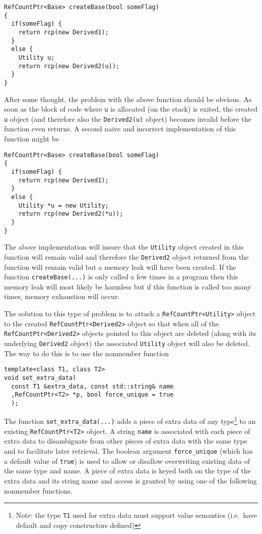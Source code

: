 {\scriptsize\begin{verbatim}
RefCountPtr<Base> createBase(bool someFlag)
{
  if(someFlag) {
    return rcp(new Derived1);
  }
  else {
    Utility u;
    return rcp(new Derived2(u));
  }
}
\end{verbatim}

}{}\noindent{}After some thought, the problem with the above function
should be obvious.  As soon as the block of code where {}\texttt{u} is
allocated (on the stack) is exited, the created {}\texttt{u} object
(and therefore also the {}\texttt{Derived2(u)} object) becomes invalid
before the function even returns.  A second naive and incorrect
implementation of this function might be

{\scriptsize\begin{verbatim}
RefCountPtr<Base> createBase(bool someFlag)
{
  if(someFlag) {
    return rcp(new Derived1);
  }
  else {
    Utility *u = new Utility;
    return rcp(new Derived2(*u));
  }
}
\end{verbatim}}

{}\noindent{} The above implementation will insure that the
{}\texttt{Utility} object created in this function will remain valid
and therefore the {}\texttt{Derived2} object returned from the
function will remain valid but a memory leak will have been created.
If the function {}\texttt{create\-Base(...)}  is only called a few
times in a program then this memory leak will most likely be harmless
but if this function is called too many times, memory exhaustion will
occur.

The solution to this type of problem is to attach a
{}\texttt{RefCountPtr<Utility>} object to the created
{}\texttt{RefCountPtr<Derived2>} object so that when all of the
{}\texttt{RefCountPtr<Derived2>} objects pointed to this object are
deleted (along with its underlying {}\texttt{Derived2} object) the
associated {}\texttt{Utility} object will also be deleted.  The way to
do this is to use the nonmember function

{\scriptsize\begin{verbatim}
template<class T1, class T2>
void set_extra_data(
  const T1 &extra_data, const std::string& name
  ,RefCountPtr<T2> *p, bool force_unique = true
  );
\end{verbatim}}

The function {}\texttt{set\-\_extra\-\_data(...)} adds a piece of
extra data of any type\footnote{Note: the type {}\texttt{T1} used for
extra data must support value semantics (i.e.~have default and copy
constructors defined)} to an existing {}\texttt{RefCountPtr<T2>}
object.  A string \texttt{name} is associated with each piece of extra
data to disambiguate from other pieces of extra data with the same
type and to facilitate later retrieval.  The boolean argument
\texttt{force\-\_unique} (which has a default value of \texttt{true})
is used to allow or disallow overwriting existing data of the same
type and name.  A piece of extra data is keyed both on the type of the
extra data and its string name and access is granted by using one of
the following nonmember functions.

